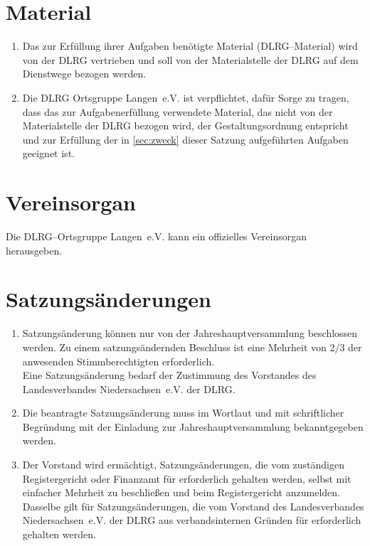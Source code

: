 \documentclass[%
12pt, %
a4paper, %
headsepline, %
footsepline, %
parskip, %
headings=normal, %
]{scrartcl}
\begin{document}
\section{Material}
\label{sec:material}
\begin{enumerate}
    \item Das zur Erfüllung ihrer Aufgaben benötigte Material (DLRG--Material) wird von der DLRG vertrieben und soll von der Materialstelle der DLRG auf dem Dienstwege bezogen werden.
    \item Die DLRG Ortsgruppe Langen~e.V. ist verpflichtet, dafür Sorge zu tragen, dass das zur Aufgabenerfüllung verwendete Material, das nicht von der Materialstelle der DLRG bezogen wird, der Gestaltungsordnung entspricht und zur Erfüllung der in \ref{sec:zweck} dieser Satzung aufgeführten Aufgaben geeignet ist.
\end{enumerate}

\section{Vereinsorgan}
\label{sec:vereinsorgan}
Die DLRG--Ortsgruppe Langen~e.V. kann ein offizielles Vereinsorgan herausgeben.

\section{Satzungsänderungen}
\label{sec:satzungsaenderungen}
\begin{enumerate}
    \item Satzungsänderung können nur von der Jahreshauptversammlung beschlossen werden. Zu einem satzungsändernden Beschluss ist eine Mehrheit von \num{2/3} der anwesenden Stimmberechtigten erforderlich.\\
      Eine Satzungsänderung bedarf der Zustimmung des Vorstandes des Landesverbandes Niedersachsen~e.V. der DLRG.
    \item Die beantragte Satzungsänderung muss im Wortlaut und mit schriftlicher Begründung mit der Einladung zur Jahreshauptversammlung bekanntgegeben werden.
    \item Der Vorstand wird ermächtigt, Satzungsänderungen, die vom zuständigen Registergericht oder Finanzamt für erforderlich gehalten werden, selbst mit einfacher Mehrheit zu beschließen und beim Registergericht anzumelden. Dasselbe gilt für Satzungsänderungen, die vom Vorstand des Landesverbandes Niedersachsen~e.V. der DLRG aus verbandsinternen Gründen für erforderlich gehalten werden.
\end{enumerate}
\end{document}
